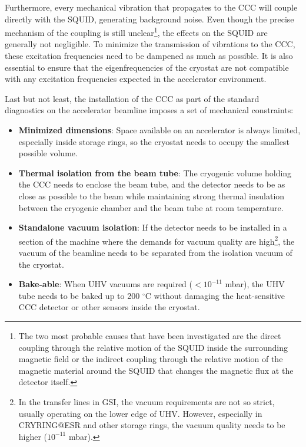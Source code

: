 \documentclass[12pt,a4paper]{report}
\begin{document}
       	Furthermore, every mechanical vibration that propagates to the CCC will couple directly with the SQUID, generating background noise. Even though the precise mechanism of the coupling is still unclear\footnote{The two most probable causes that have been investigated are the direct coupling through the relative motion of the SQUID inside the surrounding magnetic field or the indirect coupling through the relative motion of the magnetic material around the SQUID that changes the magnetic flux at the detector itself.}, the effects on the SQUID are generally not negligible. To minimize the transmission of vibrations to the CCC, these excitation frequencies need to be dampened as much as possible. It is also essential to ensure that the eigenfrequencies of the cryostat are not compatible with any excitation frequencies expected in the accelerator environment.
       	
       	Last but not least, the installation of the CCC as part of the standard diagnostics on the accelerator beamline imposes a set of mechanical constraints:
       	\begin{itemize}
       		\item \textbf{Minimized dimensions}: Space available on an accelerator is always limited, especially inside storage rings, so the cryostat needs to occupy the smallest possible volume.
       		\item \textbf{Thermal isolation from the beam tube}: The cryogenic volume holding the CCC needs to enclose the beam tube, and the detector needs to be as close as possible to the beam while maintaining strong thermal insulation between the cryogenic chamber and the beam tube at room temperature.
       		\item \textbf{Standalone vacuum isolation}: If the detector needs to be installed in a section of the machine where the demands for vacuum quality are high\footnote{In the transfer lines in GSI, the vacuum requirements are not so strict, usually operating on the lower edge of UHV. However, especially in CRYRING@ESR and other storage rings, the vacuum quality needs to be higher ($10^{-11}$ mbar).}, the vacuum of the beamline needs to be separated from the isolation vacuum of the cryostat.
       		\item \textbf{Bake-able}: When UHV vacuums are required ($ < 10^{-11}$ mbar), the UHV tube needs to be baked up to 200 $^\circ$C without damaging the heat-sensitive CCC detector or other sensors inside the cryostat.
       	\end{itemize}
       	
\end{document}
